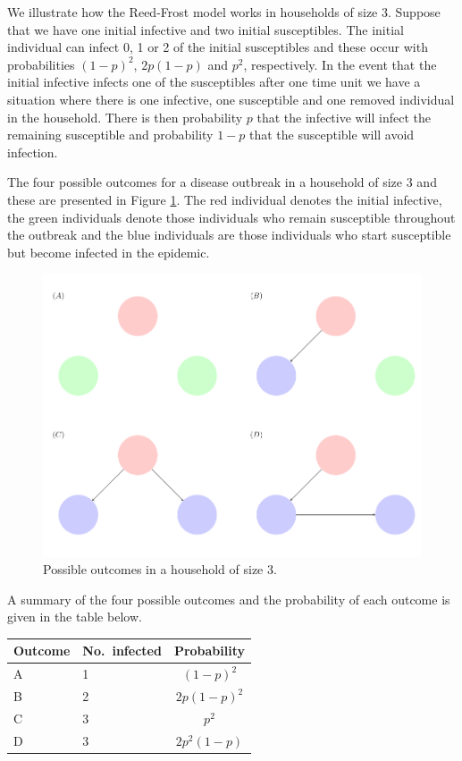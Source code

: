 \documentclass[
]{book}
\begin{document}
We illustrate how the Reed-Frost model works in households of size 3. Suppose that we have {one initial infective} and {two initial susceptibles}. The initial individual can infect 0, 1 or 2 of the initial susceptibles and these occur with probabilities \((1-p)^2\), \(2 p (1-p)\) and \(p^2\), respectively. In the event that the initial infective infects one of the susceptibles after one time unit we have a situation where there is one infective, one susceptible and one removed individual in the household. There is then probability \(p\) that the infective will infect the remaining susceptible and probability \(1-p\) that the susceptible will avoid infection.

The four possible outcomes for a disease outbreak in a household of size 3 and these are presented in Figure \ref{fig:RFoutcome}. The red individual denotes the initial infective, the green individuals denote those individuals who remain susceptible throughout the outbreak and the blue individuals are those individuals who start susceptible but become infected in the epidemic.

\begin{figure}
\includegraphics[width=0.8\linewidth]{RF} \caption{ Possible outcomes in a household of size 3.}\label{fig:RFoutcome}
\end{figure}

A summary of the four possible outcomes and the probability of each outcome is given in the table below.

\begin{longtable}[]{@{}llc@{}}
\toprule\noalign{}
Outcome & No.~infected & Probability \\
\midrule\noalign{}
\endhead
\bottomrule\noalign{}
\endlastfoot
A & 1 & \((1-p)^2\) \\
B & 2 & \(2p(1-p)^2\) \\
C & 3 & \(p^2\) \\
D & 3 & \(2p^2(1-p)\) \\
\end{longtable}
\end{document}
